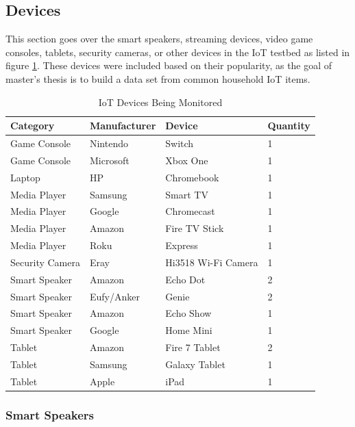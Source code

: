 \subsection{Devices}
\label{Devices}
This section goes over the smart speakers, streaming devices, video game consoles, tablets, security cameras, or other devices in the IoT testbed as listed in figure \ref{tab:devices}. These devices were included based on their popularity, as the goal of master's thesis is to build a data set from common household IoT items.

\begin{table}[H]
    \centering
    \caption{IoT Devices Being Monitored}
    \begin{tabular}{@{}llll@{}}
    \toprule
    Category & Manufacturer & Device        & Quantity \\ \midrule
    Game Console & Nintendo     & Switch        & 1        \\
    Game Console & Microsoft    & Xbox One      & 1        \\
    Laptop & HP           & Chromebook    & 1        \\
    Media Player & Samsung      & Smart TV      & 1        \\
    Media Player & Google       & Chromecast    & 1        \\
    Media Player & Amazon       & Fire TV Stick    & 1        \\
    Media Player & Roku         & Express       & 1        \\
    Security Camera & Eray    & Hi3518 Wi-Fi Camera     & 1        \\
    Smart Speaker & Amazon       & Echo Dot      & 2        \\
    Smart Speaker & Eufy/Anker   & Genie         & 2        \\
    Smart Speaker & Amazon       & Echo Show     & 1        \\
    Smart Speaker & Google       & Home Mini     & 1        \\
    Tablet & Amazon       & Fire 7 Tablet & 2        \\
    Tablet & Samsung      & Galaxy Tablet & 1        \\
    Tablet & Apple        & iPad          & 1        \\ \bottomrule
    \end{tabular}
    \label{tab:devices}
\end{table}

\subsubsection{Smart Speakers}
\label{Smart Speakers}

